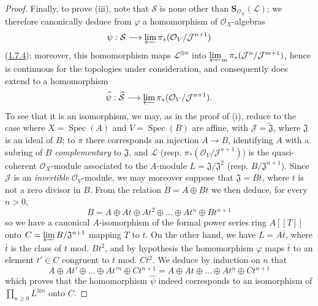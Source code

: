 \begin{proof}
Finally, to prove (iii), note that $\mathcal{S}$ is none other than
$\mathbf{S}_{\mathcal{O}_X}(\mathcal{L})$; we therefore canonically deduce
from $\varphi$ a homomorphism of $\mathcal{O}_X$-algebras
\[
  \psi:\mathcal{S}\longrightarrow
  \varprojlim\pi_*(\mathcal{O}_V/\mathcal{J}^{n+1})
\]
(\hyperref[II.1.7.4]{1.7.4}); moreover, this homomorphism maps
$\mathcal{L}^{\otimes n}$ into
$\varprojlim_m\pi_*(\mathcal{J}^n/\mathcal{J}^{m+1})$, hence is continuous for
the topologies under consideration, and consequently does extend to a
homomorphism
\[
  \widehat{\psi}:\widehat{\mathcal{S}}\longrightarrow
  \varprojlim\pi_*(\mathcal{O}_V/\mathcal{J}^{n+1}).
\]
To see that it is an isomorphism, we may, as in the proof of (i), reduce to
the case where $X=\operatorname{Spec}(A)$ and
$V=\operatorname{Spec}(B)$ are affine, with
$\mathcal{J}=\widetilde{\mathfrak{J}}$, where $\mathfrak{J}$ is an ideal of
$B$; to $\pi$ there corresponds an injection $A\to B$, identifying $A$ with a
subring of $B$ \emph{complementary} to $\mathfrak{J}$, and $\mathcal{L}$ (resp.
$\pi_*(\mathcal{O}_V/\mathcal{J}^{n+1})$) is the quasi-coherent
$\mathcal{O}_X$-module associated to the $A$-module
$L=\mathfrak{J}/\mathfrak{J}^2$ (resp. $B/\mathfrak{J}^{n+1}$). Since
$\mathcal{J}$ is an \emph{invertible} $\mathcal{O}_V$-module, we may
moreover suppose that $\mathfrak{J}=Bt$, where $t$ is not a zero divisor in
$B$. From the relation $B=A\oplus Bt$ we then deduce, for every $n>0$,
\[
  B=A\oplus At\oplus At^2\oplus\ldots\oplus At^n\oplus Bt^{n+1}
\]
so we have a canonical $A$-isomorphism of the formal power series ring
$A[[T]]$ onto $C=\varprojlim B/\mathfrak{J}^{n+1}$ mapping $T$ to $t$. On
the other hand, we have $L=A\bar t$, where $\bar t$ is the class of $t$
mod. $Bt^2$, and by hypothesis the homomorphism $\varphi$ maps $\bar t$ to an
element $t'\in C$ congruent to $t$ mod. $Ct^2$. We deduce by induction
on $n$ that
\[
  A\oplus At'\oplus\ldots\oplus At'{}^n\oplus Ct^{n+1}
  =A\oplus At\oplus\ldots\oplus At^n\oplus Ct^{n+1}
\]
which proves that the homomorphism $\widehat{\psi}$ indeed corresponds to an
isomorphism of $\prod_{n\geqslant0}L^{\otimes n}$ onto $C$.
\end{proof}

